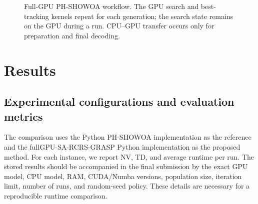 \documentclass[pdflatex,sn-mathphys-num]{sn-jnl}
\begin{document}
\begin{figure}[t]
\centering
{}
\caption{Full-GPU PH-SHOWOA workflow. The GPU search and best-tracking kernels repeat for each generation; the search state remains on the GPU during a run. CPU--GPU transfer occurs only for preparation and final decoding.}
\label{fig:workflow}
\end{figure}

\section{Results}\label{sec:results}

\subsection{Experimental configurations and evaluation metrics}\label{sec:experiments}

The comparison uses the Python PH-SHOWOA implementation as the reference and the fullGPU-SA-RCRS-GRASP Python implementation as the proposed method. For each instance, we report NV, TD, and average runtime per run. The stored results should be accompanied in the final submission by the exact GPU model, CPU model, RAM, CUDA/Numba versions, population size, iteration limit, number of runs, and random-seed policy. These details are necessary for a reproducible runtime comparison.
\end{document}
